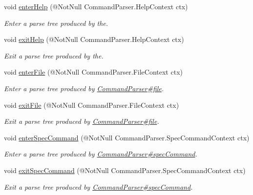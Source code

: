 \begin{DoxyCompactItemize}
void \hyperlink{interfaceedu_1_1udel_1_1cis_1_1vsl_1_1civl_1_1run_1_1common_1_1CommandListener_a76e571656a14fdca3ea1fb2f2a5a62d1}{enter\+Help} (@Not\+Null Command\+Parser.\+Help\+Context ctx)
\begin{DoxyCompactList}\small\item\em Enter a parse tree produced by the. \end{DoxyCompactList}\item 
void \hyperlink{interfaceedu_1_1udel_1_1cis_1_1vsl_1_1civl_1_1run_1_1common_1_1CommandListener_a45194299d18ab82777fcafd0afa3d27e}{exit\+Help} (@Not\+Null Command\+Parser.\+Help\+Context ctx)
\begin{DoxyCompactList}\small\item\em Exit a parse tree produced by the. \end{DoxyCompactList}\item 
void \hyperlink{interfaceedu_1_1udel_1_1cis_1_1vsl_1_1civl_1_1run_1_1common_1_1CommandListener_ace37c751789138ce14e514013abf0fcd}{enter\+File} (@Not\+Null Command\+Parser.\+File\+Context ctx)
\begin{DoxyCompactList}\small\item\em Enter a parse tree produced by \hyperlink{}{Command\+Parser\#file}. \end{DoxyCompactList}\item 
void \hyperlink{interfaceedu_1_1udel_1_1cis_1_1vsl_1_1civl_1_1run_1_1common_1_1CommandListener_a1a933d0a15491ddf55798f0ec00708ae}{exit\+File} (@Not\+Null Command\+Parser.\+File\+Context ctx)
\begin{DoxyCompactList}\small\item\em Exit a parse tree produced by \hyperlink{}{Command\+Parser\#file}. \end{DoxyCompactList}\item 
void \hyperlink{interfaceedu_1_1udel_1_1cis_1_1vsl_1_1civl_1_1run_1_1common_1_1CommandListener_adc2c6e6923b6fa18fc9a11217f2a33ab}{enter\+Spec\+Command} (@Not\+Null Command\+Parser.\+Spec\+Command\+Context ctx)
\begin{DoxyCompactList}\small\item\em Enter a parse tree produced by \hyperlink{}{Command\+Parser\#spec\+Command}. \end{DoxyCompactList}\item 
void \hyperlink{interfaceedu_1_1udel_1_1cis_1_1vsl_1_1civl_1_1run_1_1common_1_1CommandListener_a54ba1ab185326c9b51bc2d778a43f085}{exit\+Spec\+Command} (@Not\+Null Command\+Parser.\+Spec\+Command\+Context ctx)
\begin{DoxyCompactList}\small\item\em Exit a parse tree produced by \hyperlink{}{Command\+Parser\#spec\+Command}. \end{DoxyCompactList}\item 

\end{DoxyCompactItemize}
